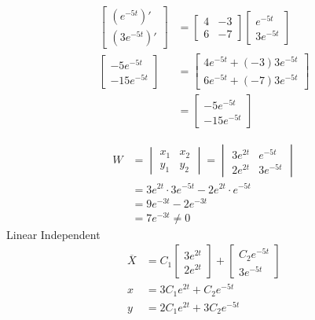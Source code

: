 \documentclass[10pt, letterpaper]{article}
\begin{document}
\begin{align*}
\begin{bmatrix}
	(e^{-5t})'\\
	(3e^{-5t})'
\end{bmatrix} &= \begin{bmatrix}
	4 & -3\\
	6 & -7
\end{bmatrix} \begin{bmatrix}
	e^{-5t}\\
	3e^{-5t}
\end{bmatrix}\\
\begin{bmatrix}
	-5e^{-5t}\\
	-15e^{-5t}
\end{bmatrix} &= \begin{bmatrix}
	4e^{-5t}+(-3)3e^{-5t}\\
	6e^{-5t}+(-7)3e^{-5t}
\end{bmatrix}\\
&= \begin{bmatrix}
	-5e^{-5t}\\
	-15e^{-5t}
\end{bmatrix}
\end{align*}

\begin{align*}
W &= \begin{vmatrix}
	x_1 & x_2\\
	y_1 & y_2
\end{vmatrix} = \begin{vmatrix}
	3e^{2t} & e^{-5t}\\
	2e^{2t} & 3e^{-5t}
\end{vmatrix}\\
&= 3e^{2t} \cdot 3e^{-5t} -2e^{2t} \cdot e^{-5t}\\
&= 9e^{-3t}-2e^{-3t}\\
&= 7e^{-3t} \neq 0
\end{align*}
Linear Independent\\
\begin{align*}
\overline{X} &= C_1\begin{bmatrix}
	3e^{2t}\\
	2e^{2t}
\end{bmatrix} + \begin{bmatrix}
	C_2e^{-5t}\\
	3e^{-5t}
\end{bmatrix}\\
x &= 3C_1e^{2t}+C_2e^{-5t}\\
y &= 2C_1e^{2t}+3C_2e^{-5t}
\end{align*}
\end{document}
